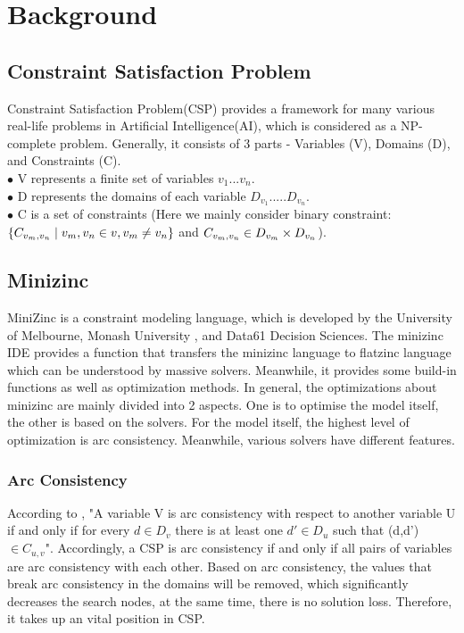 \chapter{Background}
\label{cha:background}
\section{Constraint Satisfaction Problem}
Constraint Satisfaction Problem(CSP) provides a framework for many various real-life problems in Artificial Intelligence(AI)\cite{r1}\cite{r4}, which is considered as a NP-complete problem. Generally, it consists of 3 parts - Variables (V), Domains (D), and Constraints (C)\cite{r2}\cite{r3}.\\
$\bullet$ V represents a finite set of variables $v_{1}...v_{n}$.\\
$\bullet$ D represents the domains of each variable $D_{v_{1}}.....D_{v_{n}}$.\\
$\bullet$ C is a set of constraints (Here we mainly consider binary constraint:\\ $\{C_{v_{m},v_{n}}\mid v_{m},v_{n}\in v, v_{m}\neq v_{n}\}$ and $C_{v_{m},v_{n}} \in D_{v_{m}} \times D_{v_{n}}$).
\section{Minizinc}
MiniZinc is a constraint modeling language, which is developed by the University of Melbourne, Monash University , and Data61 Decision Sciences\cite{r6}. The minizinc IDE provides a function that transfers the minizinc language to flatzinc language which can be understood by massive solvers\cite{r5}. Meanwhile, it provides some build-in functions as well as optimization methods. In general, the optimizations about minizinc are mainly divided into 2 aspects. One is to optimise the model itself, the other is based on the solvers. For the model itself, the highest level of optimization is arc consistency. Meanwhile, various solvers have different features.
\subsection{Arc Consistency}
According to \cite{r7}, "A variable V is arc consistency with respect to another variable U if and only if for every $d \in D_{v}$ there is at least one $d'\in D_{u}$ such that (d,d') $\in C_{u,v}$". Accordingly, a CSP is arc consistency if and only if all pairs of variables are arc consistency with each other. Based on arc consistency, the values that break arc consistency in the domains will be removed, which significantly decreases the search nodes, at the same time, there is no solution loss. Therefore, it takes up an vital position in CSP.
